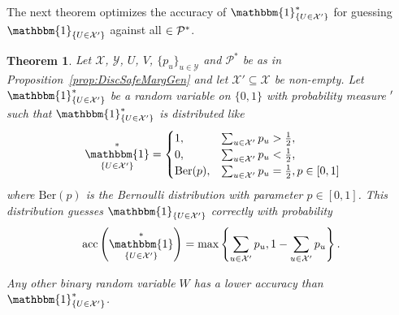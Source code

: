 \documentclass[a4paper]{report}
\theoremstyle{plain}
\newtheorem{theorem}{Theorem}[section]
\theoremstyle{definition}
\theoremstyle{remark}
\numberwithin{equation}{chapter}
\let\P\relax
\DeclareMathOperator{\P}{\mathbb{P}}
\DeclareMathOperator{\1}{\mathbbm{1}}
\newcommand{\X}{\mathcal{X}}
\newcommand{\Y}{\mathcal{Y}}
\DeclareMathOperator{\acc}{acc}
\newcommand{\Pmod}{\mathcal{P}^*}
\newcommand{\GeneralGenInd}{\1_{\{U\in\X'\}}}
\begin{document}
The next theorem optimizes the accuracy of $\GeneralGenInd^*$ for guessing $\GeneralGenInd$ against all $\P\in\Pmod$.
\begin{theorem}\label{thm:DiscAccOpt}
Let $\X$, $\Y$, $U$, $V$, $\{p_u\}_{u\in\Y}$ and $\Pmod$ be as in Proposition~\ref{prop:DiscSafeMargGen} and let $\X'\subseteq\X$ be non-empty. Let $\GeneralGenInd^*$ be a random variable on $\{0,1\}$ with probability measure $\P'$ such that $\GeneralGenInd^*$ is distributed like
\begin{equation}\
\GeneralGenInd^*=\begin{cases}
1,&\sum_{u\in\X'}p_u>\frac{1}{2},\\
0,&\sum_{u\in\X'}p_u<\frac{1}{2},\\
\mathrm{Ber}(p),&\sum_{u\in\X'}p_u=\frac{1}{2},p\in[0,1]
\end{cases}
\end{equation}
where $\mathrm{Ber}(p)$ is the Bernoulli distribution with parameter $p\in[0,1]$. This distribution guesses $\GeneralGenInd$ correctly with probability 
\begin{equation}
\acc^{\P}\left(\GeneralGenInd^*\right)=\max\left\{\sum_{u\in\X'}p_u,1-\sum_{u\in\X'}p_u\right\}.
\end{equation}

Any other binary random variable $W$ has a lower accuracy than $\GeneralGenInd^*$.
\end{theorem}
\end{document}
